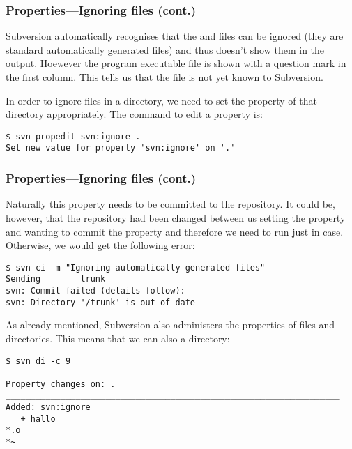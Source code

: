 \begin{frame}[fragile]
    \frametitle{Properties---Ignoring files (cont.)}
    \linuxframe

    Subversion automatically recognises that the \ttalert{*\~} and
     files can be ignored (they are standard automatically
    generated files) and thus doesn't show them in the 
    output.  Hoewever the  program executable file is shown
    with a question mark in the first column.  This tells us that the file
    is not yet known to Subversion.

    In order to ignore files in a directory, we need to set the
     property of that directory appropriately.  The
    command to edit a property is:


\begin{lstlisting}
$ svn propedit svn:ignore .
Set new value for property 'svn:ignore' on '.'
\end{lstlisting}
\end{frame}

\begin{frame}[fragile]
    \frametitle{Properties---Ignoring files (cont.)}
    \linuxframe

    Naturally this property needs to be committed to the repository.  It
    could be, however, that the repository had been changed between us
    setting the property and wanting to commit the property and therefore we
    need to run  just in case.  Otherwise, we would get
    the following error:
\begin{lstlisting}[basicstyle=\tiny\ttfamily\color{black}]
$ svn ci -m "Ignoring automatically generated files"
Sending        trunk
svn: Commit failed (details follow):
svn: Directory '/trunk' is out of date
\end{lstlisting}

    As already mentioned, Subversion also administers the properties of
    files and directories.  This means that we can also  a
    directory:
\begin{lstlisting}[basicstyle=\tiny\ttfamily\color{black}]
$ svn di -c 9

Property changes on: .
___________________________________________________________________
Added: svn:ignore
   + hallo
*.o
*~
\end{lstlisting}
\end{frame}

